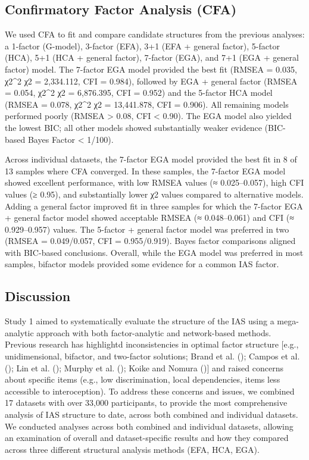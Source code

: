 \documentclass[
  jou,
  floatsintext,
  longtable,
  nolmodern,
  notxfonts,
  notimes,
  colorlinks=true,linkcolor=blue,citecolor=blue,urlcolor=blue]{apa7}
\begin{document}
\subsection{Confirmatory Factor Analysis
(CFA)}\label{confirmatory-factor-analysis-cfa}

We used CFA to fit and compare candidate structures from the previous
analyses: a 1-factor (G-model), 3-factor (EFA), 3+1 (EFA + general
factor), 5-factor (HCA), 5+1 (HCA + general factor), 7-factor (EGA), and
7+1 (EGA + general factor) model. The 7-factor EGA model provided the
best fit (RMSEA = 0.035, χ2\chi\^{}2 χ2 = 2,334.112, CFI = 0.984),
followed by EGA + general factor (RMSEA = 0.054, χ2\chi\^{}2 χ2 =
6,876.395, CFI = 0.952) and the 5-factor HCA model (RMSEA = 0.078,
χ2\chi\^{}2 χ2 = 13,441.878, CFI = 0.906). All remaining models
performed poorly (RMSEA \textgreater{} 0.08, CFI \textless{} 0.90). The
EGA model also yielded the lowest BIC; all other models showed
substantially weaker evidence (BIC-based Bayes Factor \textless{}
1/100).

Across individual datasets, the 7-factor EGA model provided the best fit
in 8 of 13 samples where CFA converged. In these samples, the 7-factor
EGA model showed excellent performance, with low RMSEA values (≈
0.025--0.057), high CFI values (≥ 0.95), and substantially lower χ2
values compared to alternative models. Adding a general factor improved
fit in three samples for which the 7-factor EGA + general factor model
showed acceptable RMSEA (≈ 0.048--0.061) and CFI (≈ 0.929--0.957)
values. The 5-factor + general factor model was preferred in two (RMSEA
= 0.049/0.057, CFI = 0.955/0.919). Bayes factor comparisons aligned with
BIC-based conclusions. Overall, while the EGA model was preferred in
most samples, bifactor models provided some evidence for a common IAS
factor.

\subsection{Discussion}\label{discussion}

Study 1 aimed to systematically evaluate the structure of the IAS using
a mega-analytic approach with both factor-analytic and network-based
methods. Previous research has highlightd inconsistencies in optimal
factor structure {[}e.g., unidimensional, bifactor, and two-factor
solutions; Brand et al. (); Campos et al.
(); Lin et al.
(); Murphy et al.
(); Koike and Nomura
(){]} and raised concerns about specific
items (e.g., low discrimination, local dependencies, items less
accessible to interoception). To address these concerns and issues, we
combined 17 datasets with over 33,000 participants, to provide the most
comprehensive analysis of IAS structure to date, across both combined
and individual datasets. We conducted analyses across both combined and
individual datasets, allowing an examination of overall and
dataset-specific results and how they compared across three different
structural analysis methods (EFA, HCA, EGA).
\end{document}

